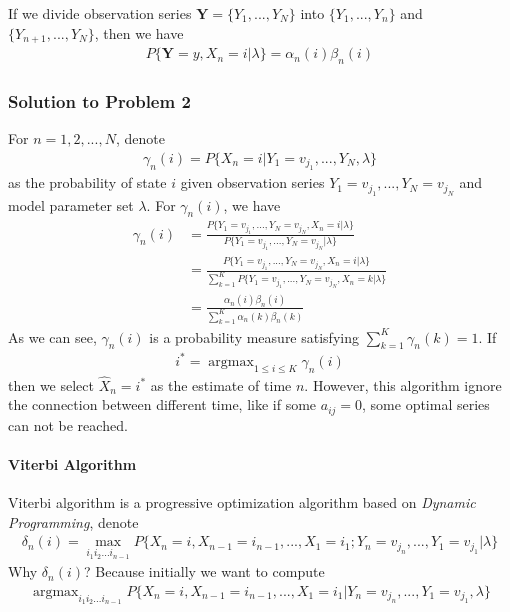 \documentclass[runningheads]{llncs}
\begin{document}
\par
If we divide observation series $\mathbf{Y} = \{ Y_1,..., Y_N \}$
into $\{ Y_1,..., Y_n \}$ and \\ $\{ Y_{n+1},..., Y_N \}$, then we have
\begin{align}
    P \{ \mathbf{Y} = y, X_n = i | \lambda \} = \alpha_n(i) \beta_n(i)
\end{align}

\subsubsection{Solution to Problem 2}
For $n = 1, 2,..., N$, denote
\begin{align}
    \gamma_n(i) = P \{ X_n = i | Y_1 = v_{j_1}, ..., Y_N, \lambda \}
\end{align}
as the probability of state $i$ given observation series
$Y_1 = v_{j_1},...,Y_N = v_{j_N}$ and model parameter set $\lambda$.
For $\gamma_n(i)$, we have
\begin{align}
    \gamma_n(i) &= \frac{P \{Y_1 = v_{j_1},...,Y_N = v_{j_N}, X_n = i | \lambda \}}{P \{Y_1 = v_{j_1},...,Y_N = v_{j_N}| \lambda \}} \\
    &= \frac{P \{Y_1 = v_{j_1},...,Y_N = v_{j_N}, X_n = i | \lambda \}}{\sum_{k=1}^K P \{Y_1 = v_{j_1},...,Y_N = v_{j_N}, X_n = k | \lambda \}} \\
    &= \frac{\alpha_n(i) \beta_n(i)}{\sum_{k=1}^K \alpha_n(k) \beta_n(k)}
\end{align}
As we can see, $\gamma_n(i)$ is a probability measure satisfying $\sum_{k=1}^K \gamma_n(k) = 1$.
If
\begin{align}
    i^* = \mathop{\arg\max}_{1 \leq i \leq K} \gamma_n(i)
\end{align}
then we select $\hat{X}_n = i^*$ as the estimate of time $n$.
However, this algorithm ignore the connection between different time,
like if some $a_{ij} = 0$, some optimal series can not be reached.
\paragraph{Viterbi Algorithm}
\par
Viterbi algorithm is a progressive optimization algorithm based on \emph{Dynamic Programming},
denote
\begin{align}
    \delta_n(i) = \max_{i_1i_2...i_{n-1}} P \{ X_n = i, X_{n-1} = i_{n-1},..., X_1 = i_1; Y_n = v_{j_n},..., Y_1 = v_{j_1} |\lambda \}
\end{align}
Why $\delta_n(i)$?
Because initially we want to compute
\begin{align}
    \mathop{\arg\max}_{i_1i_2...i_{n-1}} P \{ X_n = i, X_{n-1} = i_{n-1},..., X_1 = i_1| Y_n = v_{j_n},..., Y_1 = v_{j_1}, \lambda \}
\end{align}
\end{document}
